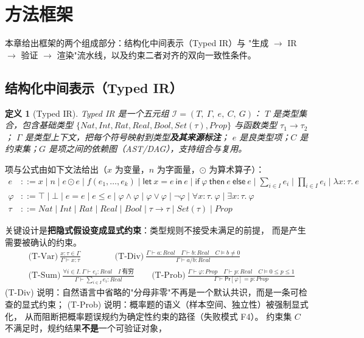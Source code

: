 \documentclass[11pt]{article}
\newtheorem{definition}{定义}[section]
\newcommand{\IR}{\ensuremath{\mathcal{I}}}
\begin{document}
\section{方法框架}
\label{sec:framework}
本章给出框架的两个组成部分：结构化中间表示（Typed IR）与
"生成 $\to$ IR $\to$ 验证 $\to$ 渲染"流水线，以及约束二者对齐的双向一致性条件。

\subsection{结构化中间表示（Typed IR）}
\begin{definition}[Typed IR]
Typed IR 是一个五元组 $\IR = (T,\ \Gamma,\ e,\ C,\ G)$：
$T$ 是类型集合，包含基础类型 $\{Nat, Int, Rat, Real, Bool, Set(\tau), Prop\}$
与函数类型 $\tau_1 \to \tau_2$；
$\Gamma$ 是类型上下文，把每个符号映射到类型\textbf{及其来源标注}；
$e$ 是良类型项；$C$ 是约束集；$G$ 是项之间的依赖图（AST/DAG），支持组合与复用。
\end{definition}

项与公式由如下文法给出（$x$ 为变量，$n$ 为字面量，$\odot$ 为算术算子）：
\begin{align*}
e &::= x \mid n \mid e \odot e \mid f(e_1,\dots,e_k) \mid \mathsf{let}\ x = e\ \mathsf{in}\ e
      \mid \mathsf{if}\ \varphi\ \mathsf{then}\ e\ \mathsf{else}\ e
      \mid \textstyle\sum_{i \in I} e_i \mid \textstyle\prod_{i \in I} e_i \mid \lambda x{:}\tau.\ e \\
\varphi &::= \top \mid \bot \mid e = e \mid e \le e \mid \varphi \wedge \varphi \mid \varphi \vee \varphi
      \mid \neg \varphi \mid \forall x{:}\tau.\ \varphi \mid \exists x{:}\tau.\ \varphi \\
\tau &::= Nat \mid Int \mid Rat \mid Real \mid Bool \mid \tau \to \tau \mid Set(\tau) \mid Prop
\end{align*}

关键设计是\textbf{把隐式假设变成显式约束}：类型规则不接受未满足的前提，
而是产生需要被确认的约束。
\begin{align*}
&\text{(T-Var)}\ \frac{x{:}\tau \in \Gamma}{\Gamma \vdash x : \tau}
\qquad\qquad
\text{(T-Div)}\ \frac{\Gamma \vdash a : Real \quad \Gamma \vdash b : Real \quad C \vDash b \neq 0}
  {\Gamma \vdash a / b : Real} \\
&\text{(T-Sum)}\ \frac{\forall i \in I.\ \Gamma \vdash e_i : Real \quad I\ \text{有穷}}
  {\Gamma \vdash \sum_{i \in I} e_i : Real}
\qquad
\text{(T-Prob)}\ \frac{\Gamma \vdash \varphi : Prop \quad \Gamma \vdash p : Real \quad C \vDash 0 \le p \le 1}
  {\Gamma \vdash \mathsf{Pr}[\varphi] = p : Prop}
\end{align*}
(T-Div) 说明：自然语言中省略的"分母非零"不再是一个默认共识，而是一条可检查的显式约束；
(T-Prob) 说明：概率题的语义（样本空间、独立性）被强制显式化，
从而阻断把概率题误规约为确定性约束的路径（失败模式 F4）。
约束集 $C$ 不满足时，规约结果\textbf{不是}一个可验证对象，
\end{document}
